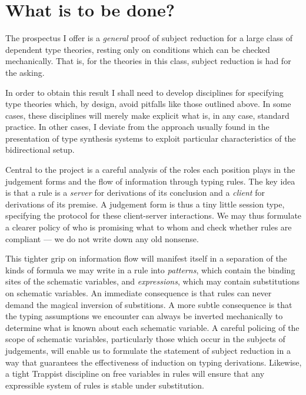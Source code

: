 \documentclass{jfp1}
\begin{document}
\section{What is to be done?}

The prospectus I offer is a \emph{general} proof of subject reduction for a
large class of dependent type theories, resting only on conditions which can
be checked mechanically. That is, for the theories in this class, subject
reduction is had for the asking.

In order to obtain this result I shall need to develop disciplines for
specifying type theories which, by design, avoid pitfalls like those
outlined above.  In some cases, these disciplines will merely make
explicit what is, in any case, standard practice. In other cases, I
deviate from the approach usually found in the presentation of type
synthesis systems to exploit particular characteristics of the
bidirectional setup.

Central to the project is a careful analysis of the roles each position
plays in the judgement forms and the flow of information through typing rules.
The key idea is that a rule is a \emph{server} for derivations of its conclusion
and a \emph{client} for derivations of its premise. A judgement form is thus a
tiny little session type, specifying the protocol for these client-server
interactions. We may thus formulate a clearer policy of who is promising
what to whom and check whether rules are compliant --- we do not write down
any old nonsense.

This tighter grip on information flow will manifest itself in a separation
of the kinds of formula we may write in a rule into \emph{patterns}, which contain
the binding sites of the schematic variables, and \emph{expressions}, which may
contain substitutions on schematic variables. An immediate consequence is
that rules can never demand the magical inversion of substitions. A more subtle
consequence is that the typing assumptions we encounter can always be inverted
mechanically to determine what is known about each schematic variable. A careful
policing of the scope of schematic variables, particularly
those which occur in the subjects of judgements, will enable us to formulate
the statement of subject reduction in a way that guarantees the effectiveness
of induction on typing derivations. Likewise, a tight Trappist discipline on
free variables in rules will ensure that any expressible system of rules is stable under
substitution.
\end{document}
